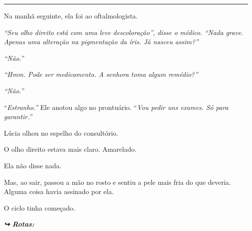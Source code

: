 \vspace{0.5em}\noindent\rule{\textwidth}{0.5pt}\vspace{0.5em}

\noindent Na manhã seguinte, ela foi ao oftalmologista.

\noindent \textit{\textquotedblleft{}Seu olho direito está com uma leve descoloração\textquotedblright{}\textit{, disse o médico. }\textquotedblleft{}Nada grave. Apenas uma alteração na pigmentação da íris. Já nasceu assim?\textquotedblright{}}

\noindent \textit{\textquotedblleft{}Não.\textquotedblright{}}

\noindent \textit{\textquotedblleft{}Hmm. Pode ser medicamento. A senhora toma algum remédio?\textquotedblright{}}

\noindent \textit{\textquotedblleft{}Não.\textquotedblright{}}

\noindent \textquotedblleft{\textit{Estranho.\textquotedblright{}} Ele anotou algo no prontuário. }\textquotedblleft{\textit{Vou pedir uns exames. Só para garantir.\textquotedblright{}}}

\noindent Lúcia olhou no espelho do consultório.

\noindent O olho direito estava mais claro.
Amarelado.

\noindent Ela não disse nada.

\noindent Mas, ao sair, passou a mão no rosto e sentiu a pele mais fria do que deveria.
\noindent Alguma coisa havia assinado por ela.

\noindent O ciclo tinha começado.

\vspace{0.5em}
\noindent\textit{\textbf{↪ Rotas:}  \rotasep {}}
